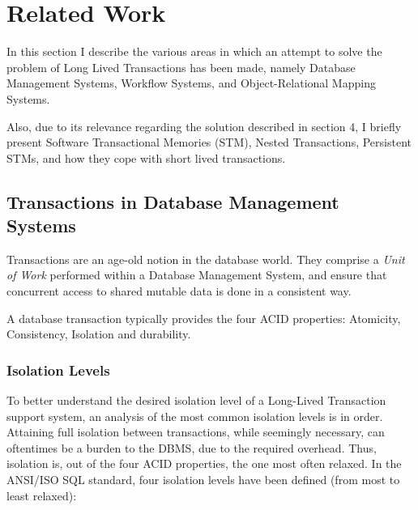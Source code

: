 \documentclass{llncs}
\begin{document}

\section{Related Work}
\label{chap:related}

In this section I describe the various areas in which an attempt to
solve the problem of Long Lived Transactions has been made, namely
Database Management Systems, Workflow Systems, and Object-Relational
Mapping Systems.

Also, due to its relevance regarding the solution described in section
4, I briefly present Software Transactional Memories (STM), Nested
Transactions, Persistent STMs, and how they cope with short lived
transactions.

\subsection{Transactions in Database Management Systems}
\label{sec:rdbms}

Transactions are an age-old notion in the database world. They
comprise a {\it Unit of Work} performed within a Database Management
System, and ensure that concurrent access to shared mutable data is
done in a consistent way.

A database transaction typically provides the four ACID properties:
Atomicity, Consistency, Isolation and durability.

\subsubsection{Isolation Levels}
\label{sec:isolation}

To better understand the desired isolation level of a Long-Lived
Transaction support system, an analysis of the most common isolation
levels is in order. Attaining full isolation between transactions,
while seemingly necessary, can oftentimes be a burden to the DBMS, due
to the required overhead. Thus, isolation is, out of the four ACID
properties, the one most often relaxed. In the ANSI/ISO SQL
standard\cite{melton1992ansi}, four isolation levels have been defined
(from most to least relaxed):
\end{document}
